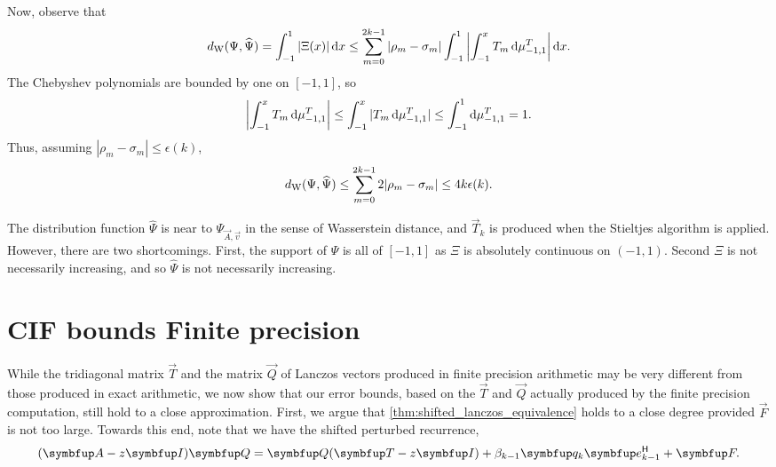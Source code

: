 Now, observe that
\begin{equation*}
    d_{\mathrm{W}}(\Psi,\widehat{\Psi})
    = \int_{-1}^{1} |\Xi(x) | \,\textup{d} x
    \leq \sum_{m=0}^{2k-1} |\rho_m-\sigma_m| \int_{-1}^{1} \left| \int_{-1}^{x} T_m \,\textup{d}\mu_{-1,1}^T \right| \textup{d}{x}.
\end{equation*}
The Chebyshev polynomials are bounded by one on $[-1,1]$, so
\begin{align*}
    \left| \int_{-1}^{x} T_m \,\textup{d}\mu_{-1,1}^T \right|
    \leq \int_{-1}^{x} |T_m \,\textup{d}\mu_{-1,1}^T |
    \leq \int_{-1}^{1} \textup{d}\mu_{-1,1}^T = 1.
\end{align*}
Thus, assuming \( |\rho_m - \sigma_m | \leq \epsilon(k) \),
\begin{equation*}
    d_{\mathrm{W}}(\Psi,\widehat{\Psi})
    \leq \sum_{m=0}^{2k-1} 2 |\rho_m-\sigma_m|
    \leq 4k \epsilon(k).
\end{equation*}

The distribution function $\widehat{\Psi}$ is near to $\Psi_{\vec{A},\vec{v}}$ in the sense of Wasserstein distance, and $\vec{T}_k$ is produced when the Stieltjes algorithm is applied. 
However, there are two shortcomings.
First, the support of $\widehat{\Psi}$ is all of $[-1,1]$ as $\Xi$ is absolutely continuous on $(-1,1)$.
Second $\Xi$ is not necessarily increasing, and so $\widehat{\Psi}$ is not necessarily increasing. 



\section{CIF bounds Finite precision}
\label{sec:finite_precision}

While the tridiagonal matrix \( \vec{T} \) and the matrix \( \vec{Q} \) of Lanczos vectors produced in finite precision arithmetic may be very different from those produced in exact arithmetic, we now show that our error bounds, based on the \( \vec{T} \) and \( \vec{Q} \) actually produced by the finite precision computation, still hold to a close approximation.
First, we argue that \cref{thm:shifted_lanczos_equivalence} holds to a close degree provided \( \vec{F} \) is not too large.
Towards this end, note that we have the shifted perturbed recurrence,
\begin{equation}
    \label{eqn:shifted_lanczos_factorization_fp}
    ( \vec{A} - z \vec{I} ) \vec{Q}
    = \vec{Q} ( \vec{T} - z \vec{I} ) + \beta_{k-1} \vec{q}_{k} \vec{e}_{k-1}^\cT + \vec{F}.
\end{equation}

